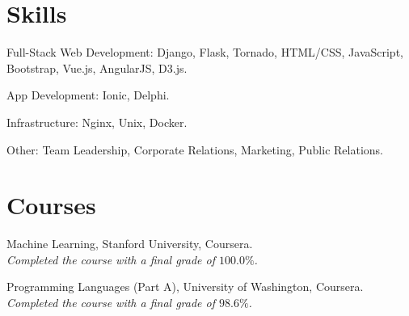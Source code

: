 \documentclass[letterpaper]{article}
\renewenvironment{itemize}{
  \begin{list}{}{
    \setlength{\leftmargin}{1.5em}
  }
}{
  \end{list}
}
\begin{document}
\section*{Skills}

\begin{itemize}
  \item Full-Stack Web Development: Django, Flask, Tornado, HTML/CSS, JavaScript, Bootstrap, Vue.js, AngularJS, D3.js.

  \item App Development: Ionic, Delphi.

  \item Infrastructure: Nginx, Unix, Docker.

  \item Other: Team Leadership, Corporate Relations, Marketing, Public Relations.
\end{itemize}

\section*{Courses}

\begin{itemize}
  \item Machine Learning, Stanford University, Coursera.\\
  \emph{Completed the course with a final grade of $100.0\%$.}

  \item Programming Languages (Part A), University of Washington, Coursera.\\
  \emph{Completed the course with a final grade of $98.6\%$.}
\end{itemize}


\bigskip

\end{document}
